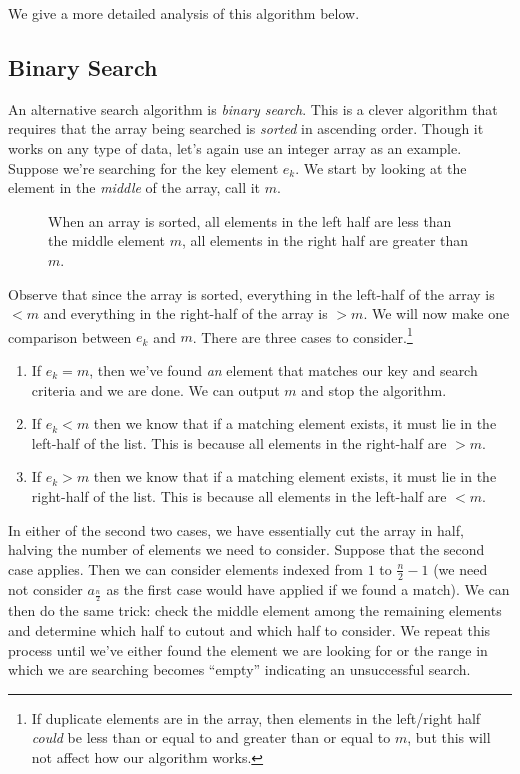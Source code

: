 We give a more detailed analysis of this algorithm below.

\subsection{Binary Search}

An alternative search algorithm is \emph{binary search}.  This is a 
clever algorithm that requires that the array being searched is 
\emph{sorted} in ascending order.  Though it works on any type of
data, let's again use an integer array as an example.  Suppose
we're searching for the key element $e_k$.  We start by looking
at the element in the \emph{middle} of the array, call it $m$.

\begin{figure}
\centering

\caption[A Sorted Array]{When an array is sorted, all elements in the left half are less than the middle element $m$, all elements in the
right half are greater than $m$.}
\label{figure:binarySearchDemo}
\end{figure}

Observe that since the array is sorted, everything in the left-half 
of the array is $< m$ and everything in the right-half of the array 
is $> m$.  We will now make one comparison between $e_k$ and $m$.
There are three cases to consider.\footnote{If duplicate elements
are in the array, then elements in the left/right half \emph{could}
be less than or equal to and greater than or equal to $m$, but this
will not affect how our algorithm works.}

\begin{enumerate}
  \item If $e_k = m$, then we've found \emph{an} element that matches
  	our key and search criteria and we are done.  We can output
	$m$ and stop the algorithm.
  \item If $e_k < m$ then we know that if a matching element exists, 
  	it must lie in the left-half of the list.  This is because all 
	elements in the right-half are $> m$.
  \item If $e_k > m$ then we know that if a matching element exists, 
  	it must lie in the right-half of the list.  This is because all 
	elements in the left-half are $< m$.
\end{enumerate}

In either of the second two cases, we have essentially cut the array
in half, halving the number of elements we need to consider.  Suppose
that the second case applies.  Then we can consider elements indexed
from $1$ to $\frac{n}{2}-1$ (we need not consider $a_{\frac{n}{2}}$ 
as the first case would have applied if we found a match).  We
can then do the same trick: check the middle element among the 
remaining elements and determine which half to cutout and which
half to consider.  We repeat this process until we've either found
the element we are looking for or the range in which we are searching
becomes ``empty'' indicating an unsuccessful search.

